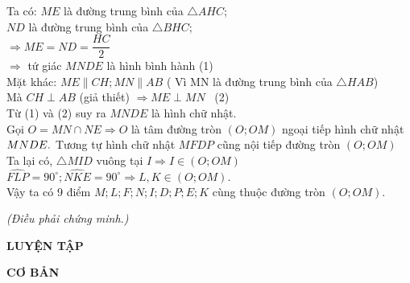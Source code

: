 \begin{vd}
{   		\hspace*{1.5cm} Ta có: $ ME $ là đường trung bình của  $ \triangle AHC $;\\
   		 $ ND $ là đường trung bình của  $ \triangle BHC $;\\  $ \Rightarrow ME = ND = \dfrac{HC}{2} $\\
   		 $ \Rightarrow$ tứ giác $ MNDE $ là hình bình hành \qquad \qquad (1)\\
   	\hspace*{1.5cm}	  Mặt khác: $ ME \parallel CH; MN \parallel AB  $ ( Vì MN là đường trung bình của $ \triangle HAB $)\\
   \hspace*{1.5cm}		 Mà $ CH \perp AB $ (giả thiết) $ \Rightarrow ME \perp MN $ \,  \qquad (2) \\
   		 Từ (1) và (2) suy ra $ MNDE $ là hình chữ nhật.\\
   	Gọi $ O = MN \cap NE \Rightarrow O $ là tâm đường tròn $ \left(O; OM\right) $ ngoại tiếp hình chữ nhật $ MNDE.\\ $
\hspace*{1.5cm}   	Tương tự hình chữ nhật $ MFDP $ cũng nội tiếp đường tròn $ \left(O; OM\right) $\\
\hspace*{1.5cm}   	Ta lại có, $ \triangle MID $ vuông tại $ I \Rightarrow I \in  \left(O; OM\right)$\\
   	$ \widehat {FLP} = 90^ \circ; \widehat {NKE} = 90^ \circ \Rightarrow L, K \in \left(O; OM\right).$\\  
   	Vậy ta có 9 điểm $ M; L; F; N; I; D; P; E; K  $ cùng thuộc đường tròn $ \left(O; OM\right). $
   	\begin{center}
\textit{(Điều phải chứng minh.)}
   	\end{center}

}    
\end{vd}


\begin{center}
\textbf{LUYỆN TẬP}
\end{center}

\noindent \textbf{CƠ BẢN}

